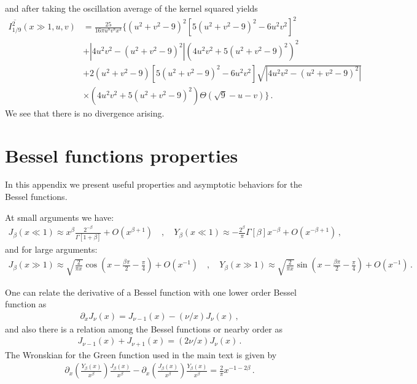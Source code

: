 \documentclass[aps,10pt,prd,groupedaddress,nofootinbib,notitlepage,eqsecnum,preprintnumbers]{revtex4-1}
\begin{document}
and after taking the oscillation average of the kernel squared yields
\begin{align}
\overline{I^2_{1/9}}(x\gg1,u,v)&=\frac{25}{16\pi u^8v^8{x}^{3}}\Bigg\{\left(u^2+v^2-9\right)^2\left[5\left(u^2+v^2-9\right)^2-6u^2v^2\right]^2\nonumber\\&
+{\left|4u^2v^2-(u^2+v^2-9)^2\right|}\left(4u^2v^2+5(u^2+v^2-9)^2\right)^2\nonumber\\&+
2\left(u^2+v^2-9\right)\left[5\left(u^2+v^2-9\right)^2-6u^2v^2\right]\sqrt{\left|4u^2v^2-(u^2+v^2-9)^2\right|}\nonumber\\&
\times\left(4u^2v^2+5(u^2+v^2-9)^2\right)\Theta(\sqrt{9}-u-v)\Bigg\}\,.
\end{align}
We see that there is no divergence arising. 

\section{Bessel functions properties \label{App:bessel}}
In this appendix we present useful properties and asymptotic behaviors for the Bessel functions.

At small arguments we have:
\begin{align}
{J_\beta(x\ll1)}\approx x^\beta\frac{2^{-\beta}}{\Gamma[1+\beta]}+O(x^{\beta+1})
\quad,\quad
{Y_\beta(x\ll1)}\approx-\frac{2^{\beta}}{\pi}{\Gamma[\beta]}x^{-\beta}+O(x^{-\beta+1})\,,
\end{align}
and for large arguments:
\begin{align}
{J_\beta(x\gg1)}\approx\sqrt{\frac{2}{\pi x}}\cos\left(x-\frac{\beta\pi}{2}-\frac{\pi}{4}\right)+O(x^{-1})
\quad ,\quad
{Y_\beta(x\gg1)}\approx\sqrt{\frac{2}{\pi x}}\sin\left(x-\frac{\beta\pi}{2}-\frac{\pi}{4}\right)+O(x^{-1})\,.
\end{align}

One can relate the derivative of a Bessel function with one lower order Bessel function as
\begin{align}
\partial_x{J}_{\nu}\left(x\right)={J}_{\nu-1}\left(x\right)-(\nu/x)%
{J}_{\nu}\left(x\right)\,,
\end{align}
and also there is a relation among the Bessel functions or nearby order as
\begin{align}
{J}_{\nu-1}\left(x\right)+{J}_{\nu+1}\left(x\right)=(2\nu/x)%
{J}_{\nu}\left(x\right)\,.
\end{align}
The Wronskian for the Green function used in the main text is given by
\begin{align}
\partial_x\left(\frac{Y_\beta(x)}{x^\beta}\right) \frac{J_\beta(x)}{x^\beta} - \partial_x\left(\frac{J_\beta(x)}{x^\beta}\right)\frac{Y_\beta(x)}{x^\beta}=\frac{2}{\pi}x^{-1-2\beta}\,.
\end{align}
\end{document}
